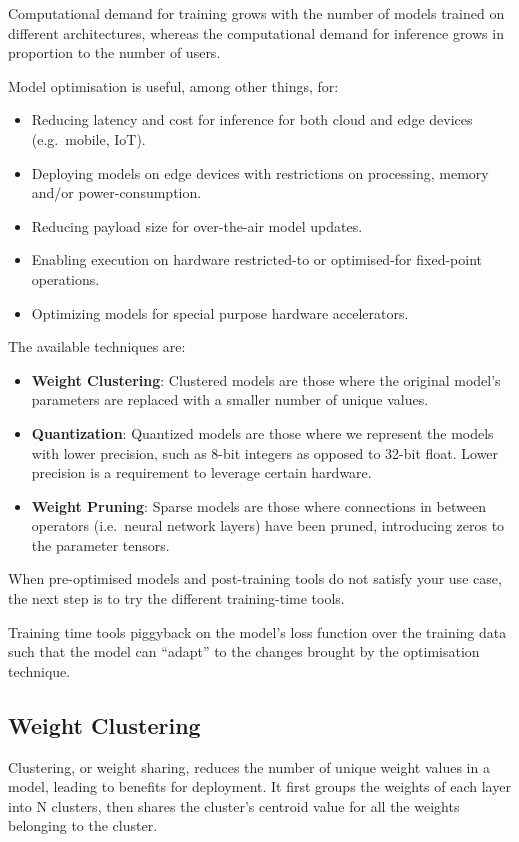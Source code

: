 Computational demand for training grows with the number of models trained on
different architectures, whereas the computational demand for inference grows
in proportion to the number of users.

Model optimisation is useful, among other things, for:

\begin{itemize}
    \item Reducing latency and cost for inference for both cloud and edge
        devices (e.g.\ mobile, IoT).
    \item Deploying models on edge devices with restrictions on processing,
        memory and/or power-consumption.
    \item Reducing payload size for over-the-air model updates.
    \item Enabling execution on hardware restricted-to or optimised-for
        fixed-point operations.
    \item Optimizing models for special purpose hardware accelerators.
\end{itemize}

The available techniques are:

\begin{itemize}
    \item \textbf{Weight Clustering}: Clustered models are those where the
        original model's parameters are replaced with a smaller number of
        unique values.
    \item \textbf{Quantization}: Quantized models are those where we represent
        the models with lower precision, such as 8-bit integers as opposed to
        32-bit float. Lower precision is a requirement to leverage certain
        hardware.
    \item \textbf{Weight Pruning}: Sparse models are those where connections in
        between operators (i.e.\ neural network layers) have been pruned,
        introducing zeros to the parameter tensors.
\end{itemize}

When pre-optimised models and post-training tools do not satisfy your use case,
the next step is to try the different training-time tools.

Training time tools piggyback on the model's loss function over the training
data such that the model can ``adapt'' to the changes brought by the
optimisation technique.~\cite{tfmot:intro}

\subsection{Weight Clustering}
Clustering, or weight sharing, reduces the number of unique weight values in a
model, leading to benefits for deployment. It first groups the weights of each
layer into N clusters, then shares the cluster's centroid value for all the
weights belonging to the cluster.

